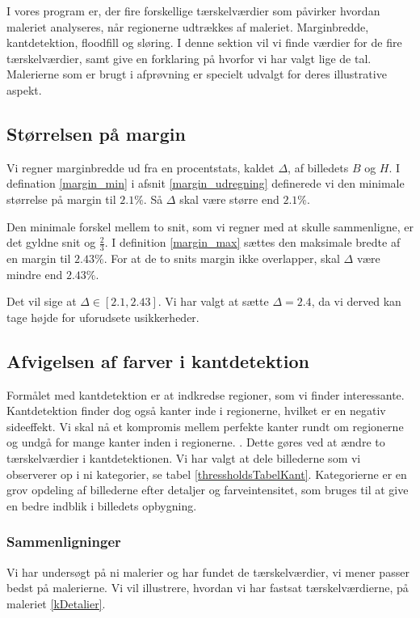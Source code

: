{\sffamily
I vores program er, der fire forskellige tærskelværdier som påvirker
hvordan maleriet analyseres, når regionerne udtrækkes af maleriet.
Marginbredde, kantdetektion, floodfill og sløring. I denne sektion vil
vi finde værdier for de fire tærskelværdier, samt give en forklaring på hvorfor vi
har valgt lige de tal. Malerierne som er brugt i afprøvning er specielt
udvalgt for deres illustrative aspekt. 
}

\subsection{Størrelsen på margin}
Vi regner marginbredde ud fra en procentstats, kaldet $\Delta$, af
billedets $B$ og $H$. I defination \ref{margin_min} i afsnit \ref{margin_udregning} definerede vi den
minimale størrelse på margin til $2.1 \%$. Så $\Delta$ skal være større end $2.1 \%$. 

Den minimale forskel mellem to snit, som vi regner med at skulle sammenligne, er
det gyldne snit og $\frac{2}{3}$. I definition \ref{margin_max} sættes den
maksimale bredte af en margin til $2.43\%$. For at de to snits margin ikke
overlapper, skal $\Delta$ være mindre end $2.43\%$. 

Det vil sige at $\Delta \in [2.1, 2.43]$. Vi har valgt at
sætte $\Delta = 2.4$, da vi derved kan tage højde for uforudsete
usikkerheder.

\subsection{Afvigelsen af farver i kantdetektion}
Formålet med kantdetektion er at indkredse regioner, som vi finder
interessante. Kantdetektion finder dog også kanter inde i regionerne,
hvilket er en negativ sideeffekt. Vi skal nå et kompromis mellem 
perfekte kanter rundt om regionerne og undgå for mange kanter inden i regionerne.
. Dette gøres ved at ændre to tærskelværdier
i kantdetektionen. Vi har valgt at dele billederne som vi observerer op
i ni kategorier, se tabel \ref{thressholdsTabelKant}. Kategorierne er en
grov opdeling af billederne efter detaljer og farveintensitet, som
bruges til at give en bedre indblik i billedets opbygning.

\subsubsection{Sammenligninger}
Vi har undersøgt på ni malerier og har fundet de tærskelværdier, vi mener
passer bedst på malerierne. Vi vil illustrere, hvordan vi har fastsat
tærskelværdierne, på maleriet \ref{kDetalier}.

